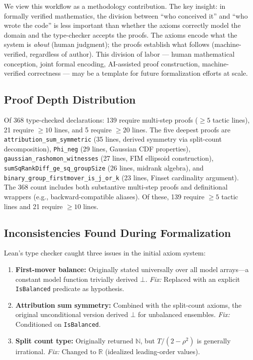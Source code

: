 \documentclass{article}
\begin{document}
\noindent We view this workflow as a methodology contribution. The key insight: in formally verified mathematics, the division between ``who conceived it'' and ``who wrote the code'' is less important than whether the axioms correctly model the domain and the type-checker accepts the proofs. The axioms encode what the system is \emph{about} (human judgment); the proofs establish what follows (machine-verified, regardless of author). This division of labor --- human mathematical conception, joint formal encoding, AI-assisted proof construction, machine-verified correctness --- may be a template for future formalization efforts at scale.

\subsection{Proof Depth Distribution}

Of 368 type-checked declarations: 139 require multi-step proofs (${\geq}5$ tactic lines), 21 require ${\geq}10$ lines, and 5 require ${\geq}20$ lines. The five deepest proofs are \texttt{attribution\_sum\_symmetric} (35 lines, derived symmetry via split-count decomposition), \texttt{Phi\_neg} (29 lines, Gaussian CDF properties), \texttt{gaussian\_rashomon\_witnesses} (27 lines, FIM ellipsoid construction), \texttt{sumSqRankDiff\_ge\_sq\_groupSize} (26 lines, midrank algebra), and \texttt{binary\_group\_firstmover\_is\_j\_or\_k} (23 lines, Finset cardinality argument).
The 368 count includes both substantive multi-step proofs and definitional wrappers (e.g., backward-compatible aliases). Of these, 139 require ${\geq}5$ tactic lines and 21 require ${\geq}10$ lines.

\subsection{Inconsistencies Found During Formalization}

Lean's type checker caught three issues in the initial axiom system:

\begin{enumerate}
\item \textbf{First-mover balance:} Originally stated universally over all model arrays---a constant model function trivially derived $\bot$. \emph{Fix:} Replaced with an explicit \texttt{IsBalanced} predicate as hypothesis.

\item \textbf{Attribution sum symmetry:} Combined with the split-count axioms, the original unconditional version derived $\bot$ for unbalanced ensembles. \emph{Fix:} Conditioned on \texttt{IsBalanced}.

\item \textbf{Split count type:} Originally returned $\mathbb{N}$, but $T/(2-\rho^2)$ is generally irrational. \emph{Fix:} Changed to $\mathbb{R}$ (idealized leading-order values).
\end{enumerate}
\end{document}
